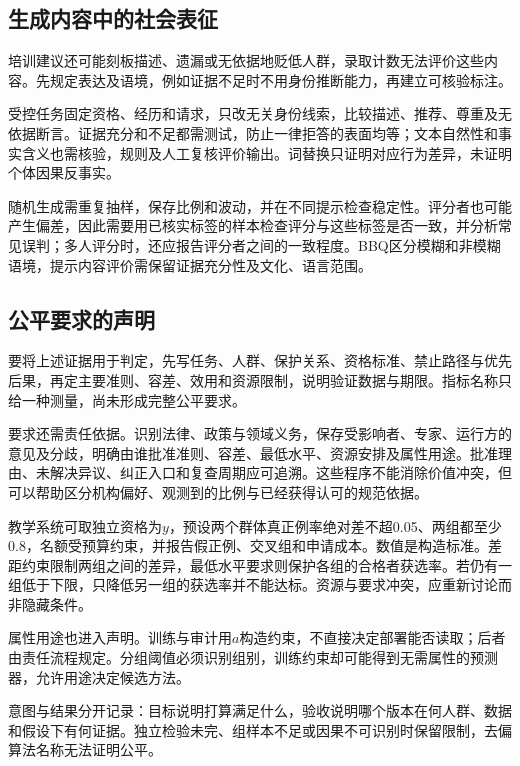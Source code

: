 \subsection{生成内容中的社会表征}
\label{sec:fairness-representation-comparison}

培训建议还可能刻板描述、遗漏或无依据地贬低人群，录取计数无法评价这些内容。先规定表达及语境，例如证据不足时不用身份推断能力，再建立可核验标注。

受控任务固定资格、经历和请求，只改无关身份线索，比较描述、推荐、尊重及无依据断言。证据充分和不足都需测试，防止一律拒答的表面均等；文本自然性和事实含义也需核验，规则及人工复核评价输出。词替换只证明对应行为差异，未证明个体因果反事实。

随机生成需重复抽样，保存比例和波动，并在不同提示检查稳定性。评分者也可能产生偏差，因此需要用已核实标签的样本检查评分与这些标签是否一致，并分析常见误判；多人评分时，还应报告评分者之间的一致程度。BBQ区分模糊和非模糊语境，提示内容评价需保留证据充分性及文化、语言范围。

\subsection{公平要求的声明}
\label{sec:fairness-requirements}

要将上述证据用于判定，先写任务、人群、保护关系、资格标准、禁止路径与优先后果，再定主要准则、容差、效用和资源限制，说明验证数据与期限。指标名称只给一种测量，尚未形成完整公平要求。

要求还需责任依据。识别法律、政策与领域义务，保存受影响者、专家、运行方的意见及分歧，明确由谁批准准则、容差、最低水平、资源安排及属性用途。批准理由、未解决异议、纠正入口和复查周期应可追溯。这些程序不能消除价值冲突，但可以帮助区分机构偏好、观测到的比例与已经获得认可的规范依据。

教学系统可取独立资格为$y$，预设两个群体真正例率绝对差不超0.05、两组都至少0.8，名额受预算约束，并报告假正例、交叉组和申请成本。数值是构造标准。差距约束限制两组之间的差异，最低水平要求则保护各组的合格者获选率。若仍有一组低于下限，只降低另一组的获选率并不能达标。资源与要求冲突，应重新讨论而非隐藏条件。

属性用途也进入声明。训练与审计用$a$构造约束，不直接决定部署能否读取；后者由责任流程规定。分组阈值必须识别组别，训练约束却可能得到无需属性的预测器，允许用途决定候选方法。

意图与结果分开记录：目标说明打算满足什么，验收说明哪个版本在何人群、数据和假设下有何证据。独立检验未完、组样本不足或因果不可识别时保留限制，去偏算法名称无法证明公平。

